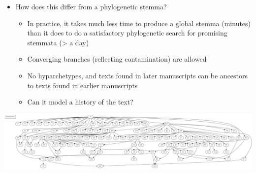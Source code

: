 \documentclass[10pt]{beamer}
\begin{document}
	\begin{frame}
		\begin{itemize}
			\item How does this differ from a phylogenetic stemma?
			\begin{itemize}
				\item In practice, it takes much less time to produce a global stemma (minutes) than it does to do a satisfactory phylogenetic search for promising stemmata (> a day)
				\item Converging branches (reflecting contamination) are allowed
				\item No hyparchetypes, and texts found in later manuscripts can be ancestors to texts found in earlier manuscripts
				\item Can it model a history of the text?
			\end{itemize}
		\end{itemize}
		\begin{center}
			\includegraphics[width=\textwidth]{../img/global-stemma-complete.pdf}
		\end{center}	
	\end{frame}
\end{document}
